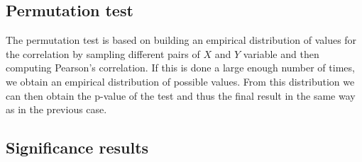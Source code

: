 \subsection{Permutation test}
 The permutation test is based on building an empirical distribution of values for the correlation by sampling different pairs of $X$ and $Y$ variable and then computing Pearson's correlation. If this is done a large enough number of times, we obtain an empirical distribution of possible values. 
 From this distribution we can then obtain the p-value of the test and thus the final result in the same way as in the previous case.
 

\subsection{Significance results}

\begin{table}
	\caption[Correlation values with significance]{Values of the correlation between Bitcoin and the other assets and their p-value using both Pearson's and the permutation test. }
	\label{tab:corr_significance}
\noindent{}
\\
\bigskip

\noindent{}

\end{table}

